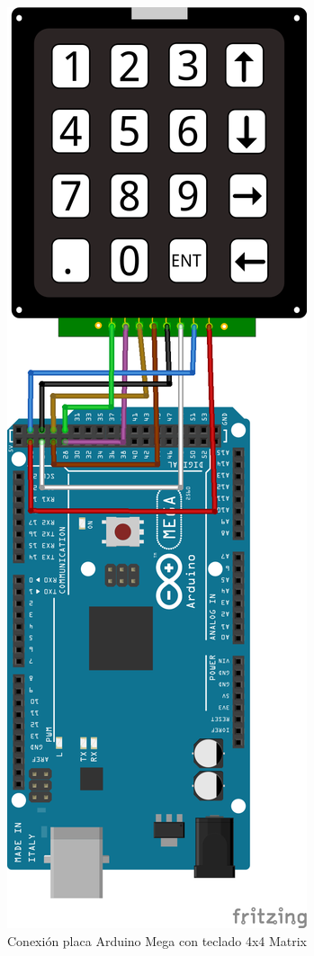 \documentclass[11pt,twoside]{book}
\begin{document}
\begin{figure}[H]
	\begin{center}
		\includegraphics[scale=0.75]{images/conexionArduinoKeypad.png}
	\end{center}
	\caption{Conexión placa Arduino Mega con teclado 4x4 Matrix}
	\label{fig:ConexionESP8266}
\end{figure}
\end{document}
